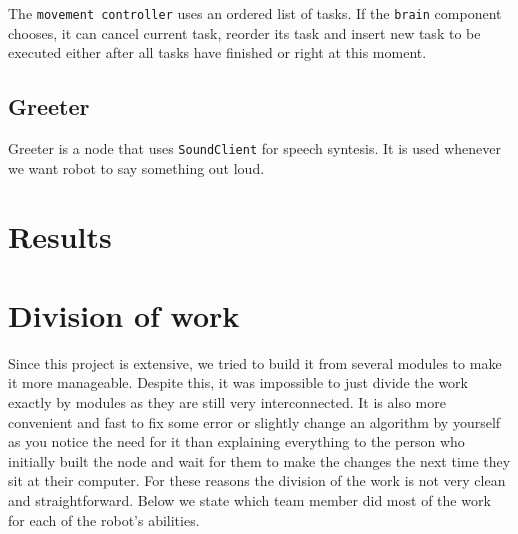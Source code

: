 \documentclass[12pt,a4paper]{article}
\begin{document}
	The \texttt{movement controller} uses an ordered list of tasks. If the \texttt{brain} component chooses, it can cancel current task, reorder its task and insert new task to be executed either after all tasks have finished or right at this moment. \\ 
	
	\subsection{Greeter}
	Greeter is a node that uses \texttt{SoundClient} for speech syntesis. It is used whenever we want robot to say something out loud. \\
	
	\section{Results}



	\section{Division of work}
	Since this project is extensive, we tried to build it from several modules to make it more manageable. Despite this, it was impossible to just divide the work exactly by modules as they are still very interconnected. It is also more convenient and fast to fix some error or slightly change an algorithm by yourself as you notice the need for it than explaining everything to the person who initially built the node and wait for them to make the changes the next time they sit at their computer. For these reasons the division of the work is not very clean and straightforward. Below we state which team member did most of the work for each of the robot's abilities. \\

	
\end{document}
